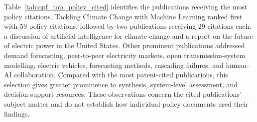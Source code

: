 \documentclass[a4paper,fleqn]{cas-sc}
\begin{document}
Table~\ref{tab:opf_top_policy_cited} identifies the publications receiving the most policy citations. Tackling Climate Change with Machine Learning ranked first with 59 policy citations, followed by two publications receiving 29 citations each: a discussion of artificial intelligence for climate change and a report on the future of electric power in the United States. Other prominent publications addressed demand forecasting, peer-to-peer electricity markets, open transmission-system modelling, electric vehicles, forecasting methods, cascading failures, and human--AI collaboration. Compared with the most patent-cited publications, this selection gives greater prominence to synthesis, system-level assessment, and decision-support resources. These observations concern the cited publications' subject matter and do not establish how individual policy documents used their findings.
\end{document}
